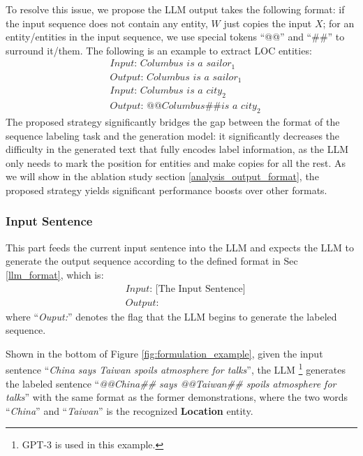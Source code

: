 \documentclass[11pt]{article}
\begin{document}
To resolve this issue, we propose the LLM output takes the following format:
if the input sequence does not contain any entity, $W$ just copies the input $X$;
for an entity/entities in the input sequence, we use special tokens “@@” and “\#\#” to surround it/them.
The following is an example to extract LOC entities:
\begin{equation}
\nonumber
    \begin{aligned}
      	&\textit{Input: }\textit{Columbus is a sailor}_{1} \\
      	&\textit{Output: }\textit{Columbus is a sailor}_{1} \\
      	&\textit{Input: }\textit{Columbus is a city}_{2} \\
      	&\textit{Output: }\textit{@@Columbus\#\# is a city}_{2}
    \end{aligned}
\end{equation}
The proposed strategy significantly bridges the gap between the format of the sequence labeling task and the generation model:
it significantly decreases the difficulty in the generated text that fully encodes label information, as the LLM only needs to mark the position for 
entities and make copies for all the rest. As we will show in the ablation study section \ref{analysis_output_format}, the proposed strategy yields significant performance boosts
over other formats. 

\subsubsection{Input Sentence}

This part feeds the current input sentence into the LLM and expects the LLM to generate the output sequence according to the defined format in Sec \ref{llm_format}, which is:
\begin{equation}
\nonumber
    \begin{aligned}
      	&\textit{Input: }\text{[The Input Sentence]} \\
      	&\textit{Output: }
    \end{aligned}
\end{equation}
where “\textit{Ouput:}” denotes the flag that the LLM begins to generate the labeled sequence.  

Shown in the bottom of Figure \ref{fig:formulation_example}, given the input sentence “\textit{China says Taiwan spoils atmosphere for talks}”, the LLM \footnote{GPT-3 is used in this example.} generates the labeled sentence “\textit{@@China\#\# says @@Taiwan\#\# spoils atmosphere for talks}” with the same format as the former demonstrations, where the two words “\textit{China}” and “\textit{Taiwan}” is the recognized \textbf{Location} entity.
\end{document}
